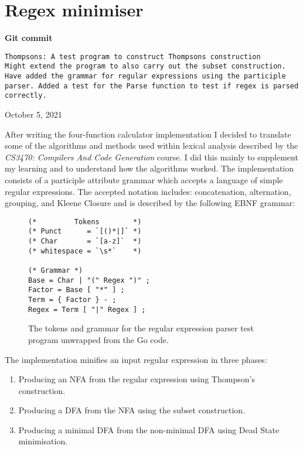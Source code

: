 \section{Regex minimiser}

\begin{center}
    \textbf{Git commit}
    \begin{verbatim}
Thompsons: A test program to construct Thompsons construction
Might extend the program to also carry out the subset construction.
Have added the grammar for regular expressions using the participle
parser. Added a test for the Parse function to test if regex is parsed
correctly.
    \end{verbatim}
    \vspace{-1em}
    \tiny{October 5, 2021}
\end{center}

After writing the four-function calculator implementation I decided to translate some of the algorithms and methods used within lexical analysis described by the \textit{CS3470: Compilers And Code Generation} course. I did this mainly to supplement my learning and to understand how the algorithms worked. The implementation consists of a participle attribute grammar which accepts a language of simple regular expressions. The accepted notation includes: concatenation, alternation, grouping, and Kleene Closure and is described by the following EBNF grammar:

\begin{figure}[H]
    \begin{verbatim}
(*         Tokens        *)
(* Punct      = `[()*|]` *)
(* Char       = `[a-z]`  *)
(* whitespace = `\s*`    *)

(* Grammar *)
Base = Char | "(" Regex ")" ;
Factor = Base [ "*" ] ;
Term = { Factor } - ;
Regex = Term [ "|" Regex ] ;
    \end{verbatim}
    \cprotect\caption{The tokens and grammar for the regular expression parser test program unwrapped from the Go code.}
\end{figure}

The implementation minifies an input regular expression in three phases:

\begin{enumerate}
    \item Producing an NFA from the regular expression using Thompson's construction.
    \item Producing a DFA from the NFA using the subset construction.
    \item Producing a minimal DFA from the non-minimal DFA using Dead State minimisation.
\end{enumerate}

